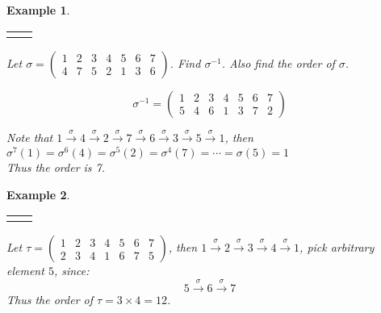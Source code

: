 \documentclass{article}
\theoremstyle{MyNonumberplain}
\theoremstyle{break}
\newcommand{\nline}{\begin{tabular}{ll}&\\\end{tabular}}
\theoremstyle{break}
\newtheorem{example}{Example}[section]
\theoremstyle{break}
\theoremstyle{definition}
\theoremstyle{break}
\begin{document}
\begin{expbox}
    \begin{example}

        \nline

        Let $\sigma = \left(\begin{array}{ccccccc}
            1 & 2 & 3 & 4 & 5 & 6 & 7\\
            4 & 7 & 5 & 2 & 1 & 3 & 6
          \end{array}\right)$. Find $\sigma^{- 1}$. Also find the order of $\sigma$.
            \begin{ansbox}
                $$\sigma^{- 1} = \left(\begin{array}{ccccccc}
                    1 & 2 & 3 & 4 & 5 & 6 & 7\\
                    5 & 4 & 6 & 1 & 3 & 7 & 2
                \end{array}\right)$$\bigskip
                
                Note that $1 \xrightarrow{\sigma} 4 \xrightarrow{\sigma} 2
                \xrightarrow{\sigma} 7 \xrightarrow{\sigma} 6 \xrightarrow{\sigma} 3
                \xrightarrow{\sigma} 5  \xrightarrow{\sigma} 1$, then $\sigma^7 (1) = \sigma^6
                (4) = \sigma^5 (2) = \sigma^4 (7) = \cdots = \sigma (5) = 1$\\
                
                Thus the order is 7.

            \end{ansbox}



    \end{example}
\end{expbox}

\begin{expbox}
    \begin{example}

        \nline

        Let $\tau = \left(\begin{array}{ccccccc}
            1 & 2 & 3 & 4 & 5 & 6 & 7\\
            2 & 3 & 4 & 1 & 6 & 7 & 5
          \end{array}\right)$, then $1 \xrightarrow{\sigma} 2 \xrightarrow{\sigma} 3
          \xrightarrow{\sigma} 4 \xrightarrow{\sigma} 1$, pick arbitrary element $5$,
            since:
          \[ 5 \xrightarrow{\sigma} 6 \xrightarrow{\sigma} 7 \]
          Thus the order of $\tau = 3 \times 4 = 12$. 
    \end{example}
\end{expbox}
\end{document}
